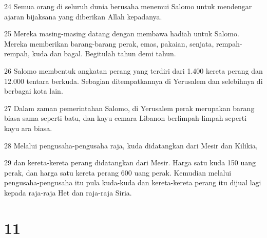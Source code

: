 \par 24 Semua orang di seluruh dunia berusaha menemui Salomo untuk mendengar ajaran bijaksana yang diberikan Allah kepadanya.
\par 25 Mereka masing-masing datang dengan membawa hadiah untuk Salomo. Mereka memberikan barang-barang perak, emas, pakaian, senjata, rempah-rempah, kuda dan bagal. Begitulah tahun demi tahun.
\par 26 Salomo membentuk angkatan perang yang terdiri dari 1.400 kereta perang dan 12.000 tentara berkuda. Sebagian ditempatkannya di Yerusalem dan selebihnya di berbagai kota lain.
\par 27 Dalam zaman pemerintahan Salomo, di Yerusalem perak merupakan barang biasa sama seperti batu, dan kayu cemara Libanon berlimpah-limpah seperti kayu ara biasa.
\par 28 Melalui pengusaha-pengusaha raja, kuda didatangkan dari Mesir dan Kilikia,
\par 29 dan kereta-kereta perang didatangkan dari Mesir. Harga satu kuda 150 uang perak, dan harga satu kereta perang 600 uang perak. Kemudian melalui pengusaha-pengusaha itu pula kuda-kuda dan kereta-kereta perang itu dijual lagi kepada raja-raja Het dan raja-raja Siria.

\chapter{11}

